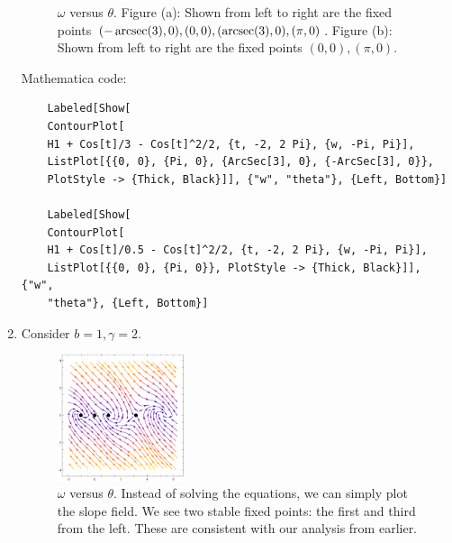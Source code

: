 \documentclass{article}
\theoremstyle{definition}
\begin{document}
\begin{enumerate}[label=(\alph*)]
	\begin{figure}[!htb]
		\centering
		\caption{$\omega$ versus $\theta$. Figure (a): Shown from left to right are the fixed points $(-\arcsec(3),0),(0,0),(\arcsec(3),0),(\pi,0)$. Figure (b): Shown from left to right are the fixed points $(0,0),(\pi,0)$.}
	\end{figure}
	Mathematica code:
	\begin{lstlisting}
	Labeled[Show[
	ContourPlot[
	H1 + Cos[t]/3 - Cos[t]^2/2, {t, -2, 2 Pi}, {w, -Pi, Pi}], 
	ListPlot[{{0, 0}, {Pi, 0}, {ArcSec[3], 0}, {-ArcSec[3], 0}}, 
	PlotStyle -> {Thick, Black}]], {"w", "theta"}, {Left, Bottom}]
	
	Labeled[Show[
	ContourPlot[
	H1 + Cos[t]/0.5 - Cos[t]^2/2, {t, -2, 2 Pi}, {w, -Pi, Pi}], 
	ListPlot[{{0, 0}, {Pi, 0}}, PlotStyle -> {Thick, Black}]], {"w", 
	"theta"}, {Left, Bottom}]
	\end{lstlisting}
	
	
	\item Consider $b=1,\gamma =2$. 
	\begin{figure}[!htb]
		\centering
		\includegraphics[width=0.35\textwidth]{33.eps}
		\caption{$\omega$ versus $\theta$. Instead of solving the equations, we can simply plot the slope field. We see two stable fixed points: the first and third from the left. These are consistent with our analysis from earlier.}
	\end{figure}


\end{enumerate}
\end{document}
